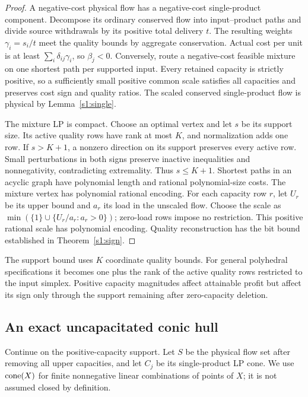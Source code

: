 \begin{proof}
A negative-cost physical flow has a negative-cost single-product
component. Decompose its ordinary conserved flow into input--product
paths and divide source withdrawals by its positive total delivery $t$.
The resulting weights $\gamma_i=s_i/t$ meet the quality bounds by
aggregate conservation. Actual cost per unit is at least
$\sum_i\delta_{ij}\gamma_i$, so $\beta_j<0$.
Conversely, route a negative-cost feasible mixture on one shortest path
per supported input. Every retained capacity is strictly positive, so
a sufficiently small positive common scale satisfies all capacities
and preserves cost sign and quality ratios. The scaled conserved
single-product flow is physical by Lemma~\ref{s1:single}.

The mixture LP is compact. Choose an optimal vertex and let $s$ be its
support size. Its active quality rows have rank at most $K$, and
normalization adds one row. If $s>K+1$, a nonzero direction on its
support preserves every active row. Small perturbations in both signs
preserve inactive inequalities and nonnegativity, contradicting
extremality. Thus $s\le K+1$. Shortest paths in an acyclic graph have
polynomial length and rational polynomial-size costs. The mixture
vertex has polynomial rational encoding. For each capacity row $r$, let
$U_r$ be its upper bound and $a_r$ its load in the unscaled flow. Choose
the scale as $\min(\{1\}\cup\{U_r/a_r:a_r>0\})$; zero-load rows impose
no restriction. This positive rational scale has polynomial encoding.
Quality reconstruction has
the bit bound established in Theorem~\ref{s1:sign}.
\end{proof}

The support bound uses $K$ coordinate quality bounds. For general
polyhedral specifications it becomes one plus the rank of the active
quality rows restricted to the input simplex. Positive capacity
magnitudes affect attainable profit but affect its sign only through
the support remaining after zero-capacity deletion.

\subsection{An exact uncapacitated conic hull}\label{s1:conic}

Continue on the positive-capacity support. Let $S$ be the physical flow
set after removing all upper capacities, and let $C_j$ be its
single-product LP cone. We use $\operatorname{cone}(X)$ for finite nonnegative linear
combinations of points of $X$; it is not assumed closed by definition.

